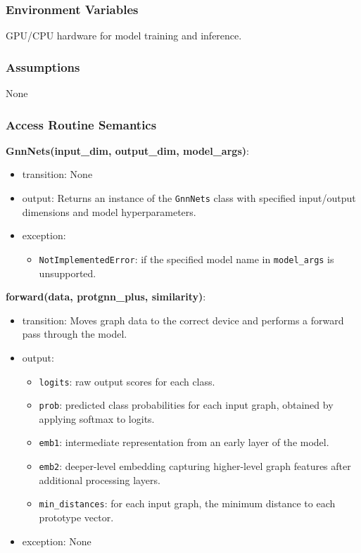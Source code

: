 \documentclass[12pt, titlepage]{article}
\begin{document}
\subsubsection{Environment Variables}
GPU/CPU hardware for model training and inference.

\subsubsection{Assumptions}
None

\subsubsection{Access Routine Semantics}

\noindent \textbf{GnnNets(input\_dim, output\_dim, model\_args)}:
\begin{itemize}
  \item transition: None
  \item output: Returns an instance of the \texttt{GnnNets} class with specified input/output dimensions and model hyperparameters.
  \item exception:     
    \begin{itemize}
      \item \texttt{NotImplementedError}: if the specified model name in \texttt{model\_args} is unsupported.
    \end{itemize}
\end{itemize}

\noindent \textbf{forward(data, protgnn\_plus, similarity)}:
\begin{itemize}
  \item transition: Moves graph data to the correct device and performs a forward pass through the model.
  \item output:
    \begin{itemize}
      \item \texttt{logits}: raw output scores for each class.
      \item \texttt{prob}: predicted class probabilities for each input graph, obtained by applying softmax to logits.
      \item \texttt{emb1}: intermediate representation from an early layer of the model.
      \item \texttt{emb2}: deeper-level embedding capturing higher-level graph features after additional processing layers.
      \item \texttt{min\_distances}: for each input graph, the minimum distance to each prototype vector.
    \end{itemize}
  \item exception: None
\end{itemize}
\end{document}
